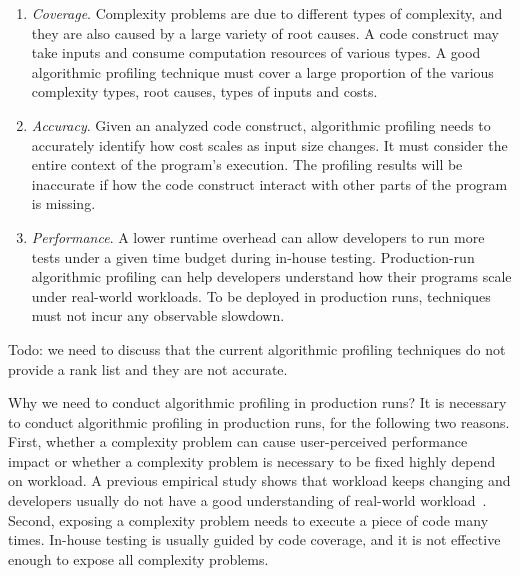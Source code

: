 \begin{enumerate}

\item \textit{Coverage}. Complexity problems are due to different types of complexity,
and they are also caused by a large variety of root causes.
A code construct may take inputs and
consume computation resources of various types.
A good algorithmic profiling technique must cover a
large proportion of the various complexity types, root causes, types of inputs and costs.


\item \textit{Accuracy}.
Given an analyzed code construct,
algorithmic profiling needs to accurately identify
how cost scales as input size changes.
It must consider the entire context of the program's execution.
The profiling results will be inaccurate if how the code construct interact with other parts of the program is missing.

\item \textit{Performance}.
A lower runtime overhead can allow developers to run more tests
under a given time budget during in-house testing.
Production-run algorithmic profiling can help developers
understand how their programs scale
under real-world workloads.
To be deployed in production runs,
techniques must not incur any observable slowdown.


\end{enumerate}



{\color{red} Todo: we need to discuss that the current algorithmic profiling techniques do not provide a rank list
and they are not accurate. }

{\color{red} Why we need to conduct algorithmic profiling in production runs?}
It is necessary to conduct algorithmic profiling in production runs, 
for the following two reasons. 
First, whether a complexity problem can 
cause user-perceived performance 
impact or whether a complexity problem is necessary to be fixed 
highly depend on workload. 
A previous empirical study shows that workload keeps changing and 
developers usually do not have a good understanding of 
real-world workload~\citep{PerfBug}. 
Second, exposing a complexity problem needs to 
execute a piece of code many times. 
In-house testing is usually guided by code coverage, 
and it is not effective enough to expose all complexity problems. 


